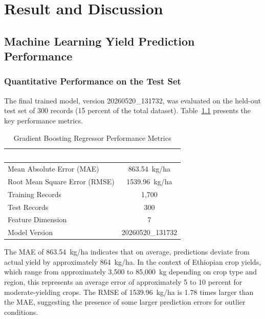 \documentclass[12pt,a4paper,oneside]{report}
\begin{document}
\clearpage
\chapter{Result and Discussion}

\section{Machine Learning Yield Prediction Performance}
\subsection{Quantitative Performance on the Test Set}
The final trained model, version 20260520\_131732, was evaluated on the held-out test set of 300 records (15 percent of the total dataset). Table~\ref{tab:model-metrics} presents the key performance metrics.

\begin{table}[H]
\centering
\caption{Gradient Boosting Regressor Performance Metrics}
\label{tab:model-metrics}
\renewcommand{\arraystretch}{1.4}
\begin{tabularx}{\textwidth}{Xc}
\toprule
\rowcolor{headerblue}
\textcolor{white}{\textbf{Metric}} & \textcolor{white}{\textbf{Value}} \\
\midrule
Mean Absolute Error (MAE) & 863.54~kg/ha \\
\rowcolor{rowalt}
Root Mean Square Error (RMSE) & 1539.96~kg/ha \\
Training Records & 1,700 \\
\rowcolor{rowalt}
Test Records & 300 \\
Feature Dimension & 7 \\
\rowcolor{rowalt}
Model Version & 20260520\_131732 \\
\bottomrule
\end{tabularx}
\end{table}

The MAE of 863.54~kg/ha indicates that on average, predictions deviate from actual yield by approximately 864~kg/ha. In the context of Ethiopian crop yields, which range from approximately 3,500 to 85,000~kg depending on crop type and region, this represents an average error of approximately 5 to 10 percent for moderate-yielding crops. The RMSE of 1539.96~kg/ha is 1.78 times larger than the MAE, suggesting the presence of some larger prediction errors for outlier conditions.
\end{document}
